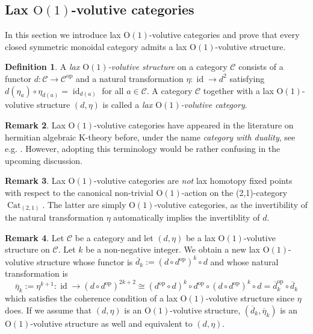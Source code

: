 \documentclass{article}
\newcommand{\opp}{\operatorname{op}}%
\newcommand{\id}{\operatorname{id}}%
\newcommand{\Cat}{\operatorname{Cat}}%
\newcommand{\Oone}{\operatorname{O(1)}}
\newcommand{\C}{\mathcal{C}}
\numberwithin{equation}{section}
\theoremstyle{definition}
\newtheorem{definition}{Definition}[subsection]
\newtheorem{remark}[definition]{Remark}
\theoremstyle{theorem}
\begin{document}
\subsection{Lax $\Oone$-volutive categories}
In this section we introduce lax $\Oone$-volutive categories and prove that every closed symmetric monoidal category admits a lax $\Oone$-volutive structure.
\begin{definition}\label{Definition: lax O(1)-volutive category}
    A \emph{lax $\Oone$-volutive structure} on a category $\C$ consists of a functor $d \colon \C \to \C^{\opp}$
    and a natural transformation $\eta \colon \id \to d^2$ satisfying $d(\eta_a) \circ \eta_{d(a)} = \id_{d(a)}$ for all $a \in \C$. 
    A category $\C$ together with a lax $\Oone$-volutive structure $(d,\eta)$ is called a \emph{lax $\Oone$-volutive category}.
\end{definition}
\begin{remark}
    Lax $\Oone$-volutive categories have appeared in the literature on hermitian algebraic K-theory before, under the name \emph{category with duality}, see e.g. 
    \cite[Definition 3.1]{Schlichting2010}. However, adopting this terminology would be rather confusing in the upcoming discussion. 
\end{remark}
\begin{remark}\label{Remark: lax homotopy fixed points vs lax volutive categories}
    Lax $\Oone$-volutive categories are \emph{not} lax homotopy fixed points with respect to the canonical non-trivial $\Oone$-action on the (2,1)-category 
    $\Cat_{(2,1)}$. The latter are simply $\Oone$-volutive categories, as the invertibility of the natural transformation $\eta$ automatically 
    implies the invertiblity of $d$. 
\end{remark}
\begin{remark}\label{Remark: lax Oone volutive structures are many}
    Let $\C$ be a category and let $(d,\eta)$ be a lax $\Oone$-volutive structure on $\C$. Let $k$ be a non-negative integer. We obtain a new lax $\Oone$-volutive 
    structure whose functor is $\overline{d}_k := (d \circ d^{\opp})^k \circ d$ and whose natural transformation is 
    \begin{equation}
        \overline{\eta}_k := \eta^{k+1} \colon \id \to (d \circ d^{\opp})^{2k+2} \cong (d^{\opp} \circ d)^k \circ d^{\opp} \circ (d \circ d^{\opp})^k \circ d = \overline{d}^{\opp}_k \circ \overline{d}_k
    \end{equation}
    which satisfies the coherence condition of a lax $\Oone$-volutive structure since $\eta$ does. If we assume that $(d,\eta)$ is an $\Oone$-volutive structure, 
    $(\overline{d}_k,\overline{\eta}_k)$ is an $\Oone$-volutive structure as well and equivalent to $(d,\eta)$. 
\end{remark}
\end{document}
